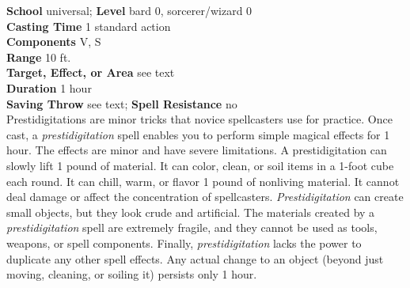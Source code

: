 \textbf{School} universal; \textbf{Level} bard 0, sorcerer/wizard 0\\
\textbf{Casting Time} 1 standard action\\
\textbf{Components} V, S\\
\textbf{Range} 10 ft.\\
\textbf{Target, Effect, or Area }see text\\
\textbf{Duration} 1 hour\\
\textbf{Saving Throw} see text; \textbf{Spell Resistance} no\\
Prestidigitations are minor tricks that novice spellcasters use for practice. Once cast, a \textit{prestidigitation }spell enables you to perform simple magical effects for 1 hour. The effects are minor and have severe limitations. A prestidigitation can slowly lift 1 pound of material. It can color, clean, or soil items in a 1-foot cube each round. It can chill, warm, or flavor 1 pound of nonliving material. It cannot deal damage or affect the concentration of spellcasters. \textit{Prestidigitation }can create small objects, but they look crude and artificial. The materials created by a \textit{prestidigitation }spell are extremely fragile, and they cannot be used as tools, weapons, or spell components. Finally, \textit{prestidigitation }lacks the power to duplicate any other spell effects. Any actual change to an object (beyond just moving, cleaning, or soiling it) persists only 1 hour.\\
